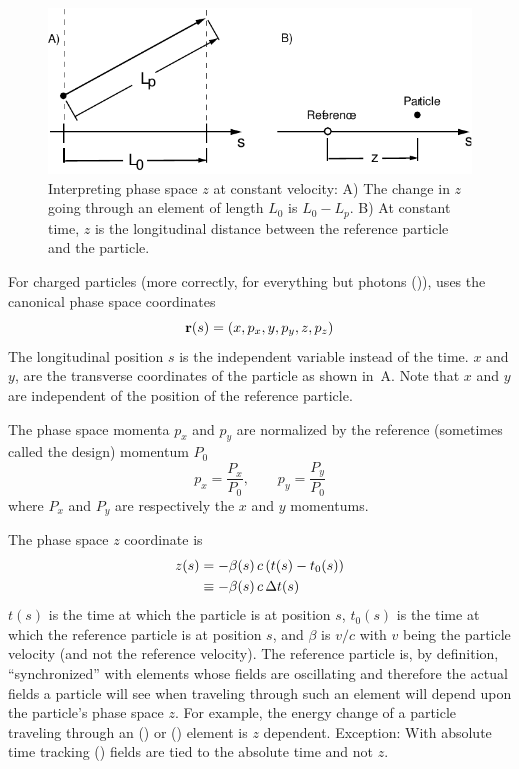\begin{figure}
\centering \includegraphics{canonical-z.pdf} \caption[Interpreting phase space $z$ at constant
velocity.]  {Interpreting phase space $z$ at constant velocity: A) The change in $z$ going through
an element of length $L_0$ is $L_0 - L_p$.  B) At constant time, $z$ is the longitudinal distance
between the reference particle and the particle.}  \label{f:canonical.z}
\end{figure}

For charged particles (more correctly, for everything but photons ()),
\accellat uses the canonical phase space coordinates
\begin{equation}
  {\bf r}(s) = (x, p_x, y, p_y, z, p_z)
\end{equation}
The longitudinal position $s$ is the independent variable instead of the time. $x$ and $y$, are the
transverse coordinates of the particle as shown in~A. Note that $x$ and $y$ are
independent of the position of the reference particle.

The phase space momenta $p_x$ and $p_y$ are normalized by the reference (sometimes called the
design) momentum $P_0$
\begin{equation}
  p_x = \frac{P_x}{P_0}, \qquad
  p_y = \frac{P_y}{P_0}
  \label{ppp}
\end{equation}
where $P_x$ and $P_y$ are respectively the $x$ and $y$ momentums.

The phase space $z$ coordinate is 
\begin{align}
  z(s) &= -\beta(s) \, c \, (t(s) - t_0(s)) \nonumber \\
    &\equiv - \beta(s) \, c \, \Delta t(s)
  \label{zbctt}
\end{align}
$t(s)$ is the time at which the particle is at position $s$, $t_0(s)$ is the time at which the
reference particle is at position $s$, and $\beta$ is $v/c$ with $v$ being the particle velocity
(and not the reference velocity). The reference particle is, by definition, ``synchronized'' with
elements whose fields are oscillating and therefore the actual fields a particle will see when
traveling through such an element will depend upon the particle's phase space $z$. For example, the
energy change of a particle traveling through an  () or 
() element is $z$ dependent. Exception: With absolute time tracking ()
fields are tied to the absolute time and not $z$.

